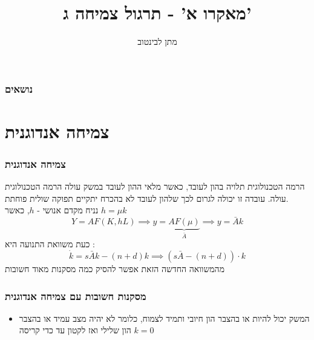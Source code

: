 \documentclass[usenames,dvipsnames,10pt]{beamer}
\title{מאקרו א' - תרגול צמיחה ג'}
\author{{ מתן לבינטוב}}
\institute[{{ אב"ג}}]{{ אוניברסיטת בן גוריון בנגב}}
\date{}
\begin{document}
\begin{RTL}
\begin{frame}
\titlepage
\end{frame}

\begin{frame}
    \frametitle{נושאים}
    \tableofcontents
\end{frame}

\section{צמיחה אנדוגנית}
\begin{frame}[allowframebreaks]
    \frametitle{צמיחה אנדוגנית}
    הרמה הטכנולוגית תלויה בהון לעובד, כאשר מלאי ההון לעובד במשק עולה הרמה
    הטכנולוגית עולה. עובדה זו יכולה לגרום לכך שלהון לעובד לא בהכרח יתקיים תפוקה
    שולית פוחתת.
    \\
    נניח מקדם אנושי - $h$, כאשר $h = \mu k $
    $$Y = AF\left(K,hL\right) \implies y = \underbrace{AF\left(\mu\right)}_{\bar A} \implies y =\bar A k$$
    כעת משוואת התנועה היא : 
    $$\dot k = s\bar A k - \left(n+d\right) k \implies \left(s \bar A - (n+d)\right)\cdot k$$
    מהמשוואה החדשה הזאת אפשר להסיק כמה מסקנות מאוד חשובות
    

\end{frame}

\begin{frame}[allowframebreaks]
    \frametitle{מסקנות חשובות עם צמיחה אנדוגנית}
    \begin{itemize}
        \item המשק יכול להיות או בהצבר הון חיובי ותמיד לצמוח, כלומר לא יהיה מצב עמיד או בהצבר הון שלילי ואז לקטון עד כדי קריסה $k=0$
        


\end{itemize}
\end{frame}
\end{RTL}
\end{document}
